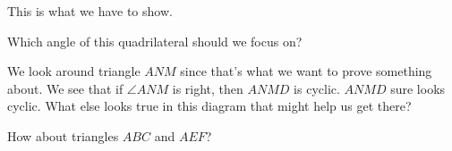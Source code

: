 
This is what we have to show.

Which angle of this quadrilateral should we focus on?









We look around triangle $ANM$ since that's what we want to prove something about. We see that if $\angle ANM$ is right, then $ANMD$ is cyclic. $ANMD$ sure looks cyclic. What else looks true in this diagram that might help us get there?

How about triangles $ABC$ and $AEF$?








